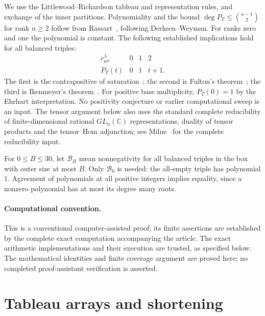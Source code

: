 \documentclass[11pt]{article}
\begin{document}
We use the Littlewood--Richardson tableau and representation rules, and
exchange of the inner partitions. Polynomiality and the bound
$\deg P_T\le \binom{n-1}{2}$ for rank $n\ge2$ follow from
Rassart~\cite[Corollary 4.2]{Rassart}, following Derksen--Weyman.
For ranks zero and one the polynomial is constant.
The following established implications hold for all balanced triples:
\[
\begin{array}{c|ccc}
c^\lambda_{\mu\nu}&0&1&2\\ \hline
P_T(t)&0&1&t+1.
\end{array}
\]
The first is the contrapositive of saturation~\cite{KT}; the second is
Fulton's theorem~\cite[Section 6.1]{KTW}; the third is
Ikenmeyer's theorem~\cite[Theorem 1.1]{Ikenmeyer}.
For positive base multiplicity, $P_T(0)=1$ by the Ehrhart interpretation.
No positivity conjecture or earlier computational sweep is an input.
The tensor argument below also uses the standard complete reducibility
of finite-dimensional rational $GL_n(\mathbb C)$ representations,
duality of tensor products and the tensor--Hom adjunction; see
Milne~\cite[17.14 and 20.35]{Milne} for the complete reducibility input.

For $0\le B\le30$, let $\mathcal B_B$ mean nonnegativity for
all balanced triples in the box with outer size at most $B$.
Only $\mathcal B_0$ is needed: the all-empty triple has polynomial $1$.
Agreement of polynomials at all positive integers implies equality,
since a nonzero polynomial has at most its degree many roots.

\paragraph{Computational convention.}
This is a conventional computer-assisted proof: its finite assertions are
established by the complete exact computation accompanying the article.
The exact arithmetic implementations and their execution are trusted,
as specified below. The mathematical identities and finite coverage
argument are proved here; no completed proof-assistant verification is asserted.

\section{Tableau arrays and shortening}
\end{document}
